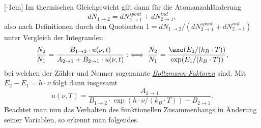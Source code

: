 \documentclass{article}
\begin{document}
    [-1cm]
    \noindent Im thermischen Gleichgewicht gilt dann für die Atomanzahländerung
    \[
        dN_{1\to 2} = dN_{2\to 1}^\textit{spont} + dN_{2\to 1}^\textit{ind},\tag{\star}
    \]
    also nach Definitionen durch den Quotienten $1 = dN_{1\to 2}/(dN_{2\to 1}^\textit{spont} + dN_{2\to 1}^\textit{ind})$  unter Vergleich der Integranden 
    \[
        \frac{N_2}{N_1} = \frac{B_{1\to 2}\cdot u(\nu,t)}{A_{2\to 1} + B_{2\to 1}\cdot u(\nu,t)} :\iff \frac{N_2}{N_1} = \frac{\exo(E_2/(k_B\cdot T))}{\exp(E_1/(k_B\cdot T))},
    \]
    bei welchen der Zähler und Nenner sogenannte \href{https://de.wikipedia.org/wiki/Boltzmann-Statistik}{\emph{Boltzmann-Faktoren}} sind. Mit $E_2-E_1 = h\cdot\nu$ folgt dann insgesamt 
    \[
        u(\nu,T) = \frac{A_{2\to 1}}{B_{1\to 2}\cdot\exp(h\cdot\nu/(k_B\cdot T)) - B_{2\to 1}}.
    \]
    Beachtet man nun das Verhalten des funktionellen Zusammenhangs in Änderung seiner Variablen, so erkennt man folgendes.
\end{document}

